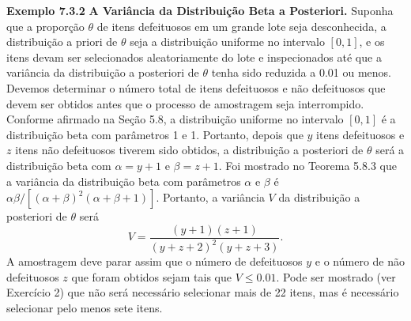 \vspace{1cm}
\noindent\textbf{Exemplo 7.3.2} \quad \textbf{A Variância da Distribuição Beta a Posteriori.} Suponha que a proporção $\theta$ de itens defeituosos em um grande lote seja desconhecida, a distribuição a priori de $\theta$ seja a distribuição uniforme no intervalo $[0, 1]$, e os itens devam ser selecionados aleatoriamente do lote e inspecionados até que a variância da distribuição a posteriori de $\theta$ tenha sido reduzida a 0.01 ou menos. Devemos determinar o número total de itens defeituosos e não defeituosos que devem ser obtidos antes que o processo de amostragem seja interrompido.
Conforme afirmado na Seção 5.8, a distribuição uniforme no intervalo $[0, 1]$ é a distribuição beta com parâmetros 1 e 1. Portanto, depois que $y$ itens defeituosos e $z$ itens não defeituosos tiverem sido obtidos, a distribuição a posteriori de $\theta$ será a distribuição beta com $\alpha=y+1$ e $\beta=z+1$. Foi mostrado no Teorema 5.8.3 que a variância da distribuição beta com parâmetros $\alpha$ e $\beta$ é $\alpha\beta/ [(\alpha+\beta)^2(\alpha+\beta+1)]$. Portanto, a variância $V$ da distribuição a posteriori de $\theta$ será
$$ V = \frac{(y+1)(z+1)}{(y+z+2)^2(y+z+3)}. $$
A amostragem deve parar assim que o número de defeituosos $y$ e o número de não defeituosos $z$ que foram obtidos sejam tais que $V \le 0.01$. Pode ser mostrado (ver Exercício 2) que não será necessário selecionar mais de 22 itens, mas é necessário selecionar pelo menos sete itens.

